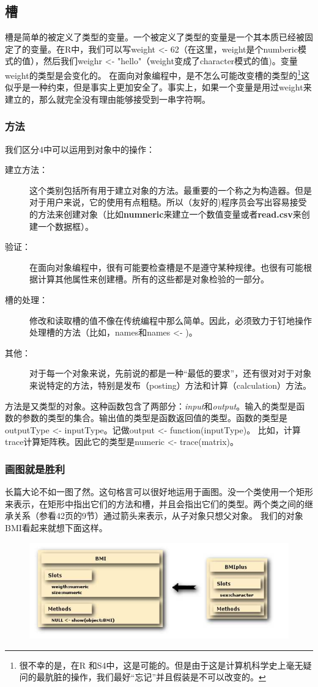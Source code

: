 \documentclass[12pt,a4paper]{article}\usepackage{graphicx, color}
\begin{document}
\subsection{槽}
槽是简单的被定义了类型的变量。一个被定义了类型的变量是一个其本质已经被固定了的变量。在R中，我们可以写weight <- 62（在这里，weight是个numberic模式的值），然后我们weighr <- "hello"（weight变成了character模式的值)。变量weight的类型是会变化的。
在面向对象编程中，是不怎么可能改变槽的类型的\footnote{很不幸的是，在R
和S4中，这是可能的。但是由于这是计算机科学史上毫无疑问的最肮脏的操作，我们最好“忘记”并且假装是不可以改变的。}这似乎是一种约束，但是事实上更加安全了。事实上，如果一个变量是用过weight来建立的，那么就完全没有理由能够接受到一串字符啊。

\subsubsection{方法}
我们区分4中可以运用到对象中的操作：
\begin{description}
  \item[建立方法：]这个类别包括所有用于建立对象的方法。最重要的一个称之为构造器。但是对于用户来说，它的使用有点粗糙。所以（友好的)程序员会写出容易接受的方法来创建对象（比如\textbf{numneric}来建立一个数值变量或者\textbf{read.csv}来创建一个数据框）。
  \item[验证：]在面向对象编程中，很有可能要检查槽是不是遵守某种规律。也很有可能根据计算其他属性来创建槽。所有的这些都是对象检验的一部分。
  \item[槽的处理：]修改和读取槽的值不像在传统编程中那么简单。因此，必须致力于钉地操作处理槽的方法（比如，names和names <- )。
  \item[其他：]对于每一个对象来说，先前说的都是一种“最低的要求”，还有很对对于对象来说特定的方法，特别是发布（posting）方法和计算（calculation）方法。
\end{description}
方法是又类型的对象。这种函数包含了两部分：\emph{input}和\emph{output}。输入的类型是函数的参数的类型的集合。输出值的类型是函数返回值的类型。函数的类型是outputType <- inputType。记做output <- function(inputType)。
比如，计算trace计算矩阵秩。因此它的类型是numeric <- trace(matrix)。

\subsubsection{画图就是胜利}
长篇大论不如一图了然。这句格言可以很好地运用于画图。没一个类使用一个矩形来表示，在矩形中指出它们的方法和槽，并且会指出它们的类型。两个类之间的继承关系（参看42页的9节）通过箭头来表示，从子对象只想父对象。
我们的对象BMI看起来就想下面这样。
\begin{figure}[htbp]
\centering
\includegraphics[width=5in]{./screenshot01.png}
\caption{}
\label{}
\end{figure} 
\end{document}
